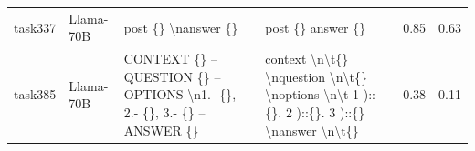\begin{longtable}{@{}p{0.8cm\tiny}p{1cm\tiny}p{4.1cm\ttfamily\tiny}p{4.1cm\ttfamily\tiny}p{0.8cm\tiny}p{0.8cm\tiny}@{}}
task337   & Llama-70B  & post \{\} \textbackslash{}nanswer \{\}                                                                                                                                                                                                                                                                                                                                                                                                                                                                                  & post \{\} answer \{\}                                                                                                                                                                                                                                                                                                                                                                                                                                                                                                                                                             & 0.85 & 0.63 \\
task385   & Llama-70B  & CONTEXT \{\} -- QUESTION \{\} -- OPTIONS \textbackslash{}n1.- \{\}, 2.- \{\}, 3.- \{\} -- ANSWER \{\}                                                                                                                                                                                                                                                                                                                                                                                                                   & context \textbackslash{}n\textbackslash{}t\{\} \textbackslash{}nquestion \textbackslash{}n\textbackslash{}t\{\} \textbackslash{}noptions \textbackslash{}n\textbackslash{}t  1 )::\{\}. 2 )::\{\}. 3 )::\{\} \textbackslash{}nanswer \textbackslash{}n\textbackslash{}t\{\}                                                                                                                                                                                                                                                                                                       & 0.38 & 0.11 \\

\end{longtable}
